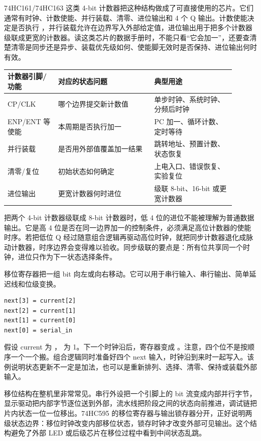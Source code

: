 74HC161/74HC163 这类 4-bit 计数器把这种结构做成了可直接使用的芯片。它们通常有时钟、计数使能、并行装载、清零、进位输出和 4 个 Q 输出。计数使能决定是否执行 ，并行装载允许在边界写入外部给定值，进位输出用于把多个计数器级联成更宽的计数器。读这类芯片的数据手册时，不能只看“它会加一”，还要查清楚清零是同步还是异步、装载优先级如何、使能脚无效时是否保持、进位输出何时有效。

\begin{longtable}{L{0.2\linewidth}L{0.38\linewidth}L{0.32\linewidth}}
\toprule
计数器引脚/功能 & 对应的状态问题 & 典型用途 \\
\midrule
CP/CLK & 哪个边界提交新计数值 & 单步时钟、系统时钟、分频后时钟 \\
ENP/ENT 等使能 & 本周期是否执行加一 & PC 加一、循环计数、定时等待 \\
并行装载 & 是否用外部值覆盖加一结果 & 跳转地址、预置计数、状态恢复 \\
清零/复位 & 初始状态如何确定 & 上电入口、错误恢复、实验复位 \\
进位输出 & 更宽计数器何时进位 & 级联 8-bit、16-bit 或更宽计数器 \\
\bottomrule
\end{longtable}

把两个 4-bit 计数器级联成 8-bit 计数器时，低 4 位的进位不能被理解为普通数据输出。它是高 4 位是否在同一边界加一的控制条件，必须满足高位计数器的使能时序。若把低位 Q 经过随意组合逻辑再驱动高位时钟，就把同步计数器退化成脉动计数器，时序边界会变得难以验收。同步级联的要点是：所有位共享同一个时钟，进位只作为下一状态选择条件。

移位寄存器把一组 bit 向左或向右移动。它可以用于串行输入、串行输出、简单延迟线和位级变换。

\begin{lstlisting}
next[3] = current[2]
next[2] = current[1]
next[1] = current[0]
next[0] = serial_in
\end{lstlisting}



假设 current 为 ， 为 1。下一个时钟沿后，寄存器变成 。注意，四个位不是按顺序一个一个搬。组合逻辑同时准备好四个 next 输入，时钟沿到来时一起写入。该例说明状态更新不一定是加法，也可以是重新排列、选择、清零、保持或装载外部输入。

移位结构在整机里非常常见。串行外设把一个引脚上的 bit 流变成内部并行字节，显示驱动把内部字节逐位送到外部，流水线把阶段之间的状态向前推进，调试链把片内状态一位一位移出。74HC595 的移位寄存器与输出锁存器分开，正好说明两级状态边界：移位时钟改变内部移位状态，锁存时钟才改变外部可见输出。这个结构避免了外部 LED 或后级芯片在移位过程中看到中间状态乱跳。

